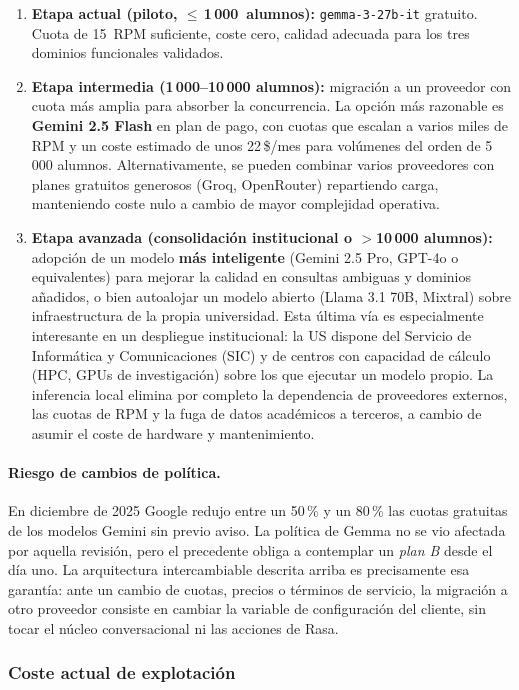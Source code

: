 \begin{enumerate}
    \item \textbf{Etapa actual (piloto, $\leq$\,1\,000~alumnos):} \texttt{gemma-3-27b-it} gratuito. Cuota de 15~RPM suficiente, coste cero, calidad adecuada para los tres dominios funcionales validados.
    \item \textbf{Etapa intermedia (1\,000--10\,000 alumnos):} migración a un proveedor con cuota más amplia para absorber la concurrencia. La opción más razonable es \textbf{Gemini 2.5 Flash} en plan de pago, con cuotas que escalan a varios miles de RPM y un coste estimado de unos 22\,\$/mes para volúmenes del orden de 5\,000 alumnos. Alternativamente, se pueden combinar varios proveedores con planes gratuitos generosos (Groq, OpenRouter) repartiendo carga, manteniendo coste nulo a cambio de mayor complejidad operativa.
    \item \textbf{Etapa avanzada (consolidación institucional o $>$10\,000 alumnos):} adopción de un modelo \textbf{más inteligente} (Gemini 2.5 Pro, GPT-4o o equivalentes) para mejorar la calidad en consultas ambiguas y dominios añadidos, o bien autoalojar un modelo abierto (Llama 3.1 70B, Mixtral) sobre infraestructura de la propia universidad. Esta última vía es especialmente interesante en un despliegue institucional: la US dispone del Servicio de Informática y Comunicaciones (SIC) y de centros con capacidad de cálculo (HPC, GPUs de investigación) sobre los que ejecutar un modelo propio. La inferencia local elimina por completo la dependencia de proveedores externos, las cuotas de RPM y la fuga de datos académicos a terceros, a cambio de asumir el coste de hardware y mantenimiento.
\end{enumerate}

\paragraph{Riesgo de cambios de política.} En diciembre de 2025 Google redujo entre un 50\,\% y un 80\,\% las cuotas gratuitas de los modelos Gemini sin previo aviso. La política de Gemma no se vio afectada por aquella revisión, pero el precedente obliga a contemplar un \textit{plan B} desde el día uno. La arquitectura intercambiable descrita arriba es precisamente esa garantía: ante un cambio de cuotas, precios o términos de servicio, la migración a otro proveedor consiste en cambiar la variable de configuración del cliente, sin tocar el núcleo conversacional ni las acciones de Rasa.

\subsubsection{Coste actual de explotación}

